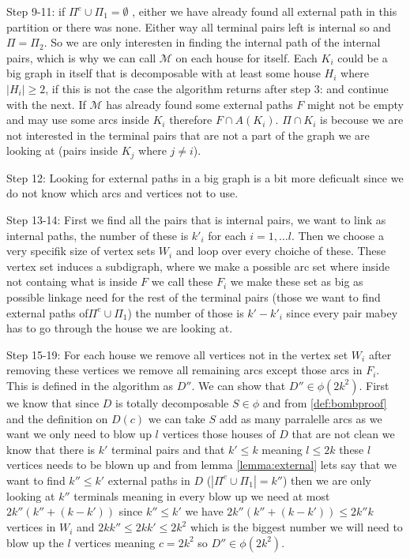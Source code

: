     Step 9-11: if $\Pi^e\cup \Pi_1=\emptyset$ , either we have already found all external path in this partition or there was none. 
    Either way all terminal pairs left is internal so and $\Pi =\Pi_2$. So we are only interesten in finding the internal path of the internal pairs, which is why we can call $\mathcal{M}$ on each house for itself.
    Each $K_i$ could be a big graph in itself that is decomposable with at least some house $H_i$ where $|H_i|\geq 2$, if this is not the case the algorithm returns after step 3: and continue with the next. 
    If $\mathcal{M}$ has already found some external paths $F$ might not be empty  and may use some arcs inside $K_i$ therefore $F\cap A(K_i)$. $\Pi \cap K_i$ is becouse we are not interested in the terminal pairs that are not a part of the graph we are looking at (pairs inside $K_j$ where $j\neq i$).

    Step 12: Looking for external paths in a big graph is a bit more deficualt since we do not know which arcs and vertices not to use.
    
    Step 13-14: First we find all the pairs that is internal pairs, we want to link as internal paths, the number of these is $k'_i$ for each $i=1,\dots l$. Then we choose a very specifik size of vertex sets $W_i$ and loop over every choiche of these. These vertex set induces a subdigraph, where we make a possible arc set where inside not containg what is inside $F$ we call these $F_i$ we make these set as big as possible linkage need for the rest of the terminal pairs (those we want to find external paths of$\Pi^e\cup \Pi_1$) the number of those is $k'-k'_i$ since every pair mabey has to go through the house we are looking at.
    
    Step 15-19: For each house we remove all vertices not in the vertex set $W_i$ after removing these vertices we remove all remaining arcs except those arcs in $F_i$.
    This is defined in the algorithm as $D''$. We can show that $D''\in \phi(2k^2)$. First we know that since $D$ is totally decomposable $S\in \phi$ and from \autoref{def:bombproof} and the definition on $D(c)$ we can take $S$ add as many parralelle arcs as we want we only need to blow up $l$ vertices those houses of $D$ that are not clean we know that there is $k'$ terminal pairs and that $k'\leq k$ meaning $l\leq 2k$ these $l$ vertices needs to be blown up and from lemma \autoref{lemma:external} lets say that we want to find $k''\leq k'$ external paths in $D$ ($|\Pi^e \cup \Pi_1|=k''$) then we are only looking at $k''$ terminals meaning in every blow up we need at most $2k''(k''+(k-k'))$ since $k''\leq k'$ we have $2k''(k''+(k-k'))\leq 2k''k$ vertices in $W_i$ and $2kk''\leq 2kk'\leq 2k^2$ which is the biggest number we will need to blow up the $l$ vertices meaning $c=2k^2$ so $D''\in \phi (2k^2)$.

